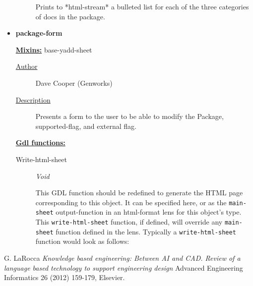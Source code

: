 \documentclass [11pt]{book}
\begin{document}
\begin{itemize}
\begin{description}
 Prints to *html-stream* a bulleted list for each of the three categories of docs in the package.




\end{description}







\item {}
\label{prim:package-form}
\textbf{package-form}


\textbf{
\underline{Mixins:}} base-yadd-sheet





\begin{description}

\item [
\underline{Author}]


Dave Cooper (Genworks)



\item [
\underline{Description}]


Presents a form to the user to be able to modify the Package, 
supported-flag, and external flag.



\end{description}








\textbf{
\underline{Gdl functions:}}

\begin{description}

\item [Write-html-sheet]
\emph{Void}

 This GDL function should be redefined to generate the HTML page corresponding to this object.
It can be specified here, or as the \texttt{main-sheet} output-function in an html-format lens for this
object's type. This \texttt{write-html-sheet} function, if defined,  will override any \texttt{main-sheet}
function defined in the lens. Typically a \texttt{write-html-sheet} function would look as follows:




\end{description}







\end{itemize}





\backmatter

\begin{thebibliography}{1}

 G. LaRocca \emph{Knowledge based engineering: Between AI
and CAD. Review of a language based technology to support engineering design} 
Advanced Engineering Informatics 26 (2012) 159-179, Elsevier.

\end{thebibliography}


\printindex
\end{document}
